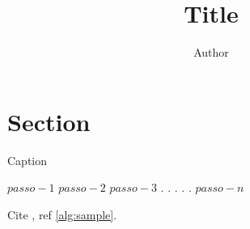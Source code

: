 \documentclass{custom-article}
\title{Title}
\author{Author}
\date{\the\year}
\begin{document}
\maketitle

\newpage

\tableofcontents

\newpage

\section{Section}

\begin{algorithm}[htbp]
\caption{Caption}
\label{alg:sample}
\begin{algorithmic}[1]
\State $passo-1$
\State $passo-2$
\State $passo-3$
\State $.$
\State $.$
\State $.$
\State $.$
\State $.$
\State $passo-n$
\EndProcedure
\end{algorithmic}
\end{algorithm}

Cite \cite{vapnik2000nature}, ref \ref{alg:sample}.

\newpage


\end{document}
